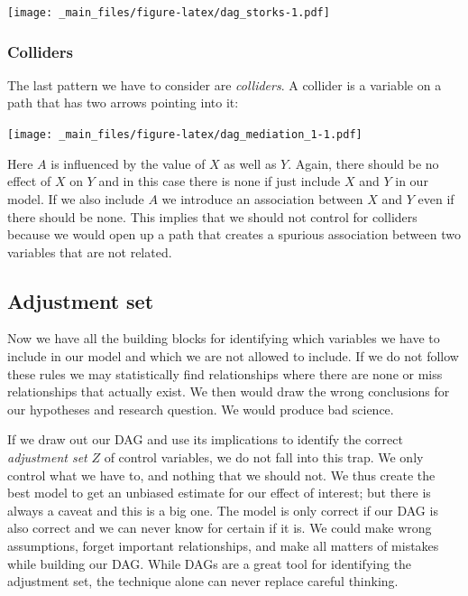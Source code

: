 \documentclass[
]{book}
\begin{document}
\texttt{[image: \_main\_files/figure-latex/dag\_storks-1.pdf]}

\hypertarget{colliders}{%
\subsubsection{Colliders}\label{colliders}}

The last pattern we have to consider are \emph{colliders}. A collider is a variable
on a path that has two arrows pointing into it:

\texttt{[image: \_main\_files/figure-latex/dag\_mediation\_1-1.pdf]}

Here \(A\) is influenced by the value of \(X\) as well as \(Y\). Again, there should
be no effect of \(X\) on \(Y\) and in this case there is none if just include \(X\)
and \(Y\) in our model. If we also include \(A\) we introduce an association
between \(X\) and \(Y\) even if there should be none. This implies that we should
not control for colliders because we would open up a path that creates a spurious
association between two variables that are not related.

\hypertarget{adjustment-set}{%
\subsection{Adjustment set}\label{adjustment-set}}

Now we have all the building blocks for identifying which variables we have to
include in our model and which we are not allowed to include. If we do not follow
these rules we may statistically find relationships where there are none or miss
relationships that actually exist. We then would draw the wrong conclusions for
our hypotheses and research question. We would produce bad science.

If we draw out our DAG and use its implications to identify the correct
\emph{adjustment set} \(Z\) of control variables, we do not fall into this trap.
We only control what we have to, and nothing that we should not. We thus create
the best model to get an unbiased estimate for our effect of interest;
but there is always a caveat and this is a big one. The model is only correct if
our DAG is also correct and we can never know for certain if it is. We could
make wrong assumptions, forget important relationships, and make all matters of
mistakes while building our DAG. While DAGs are a great tool for identifying the
adjustment set, the technique alone can never replace careful thinking.
\end{document}

